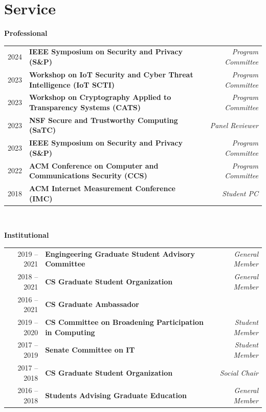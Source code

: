 \documentclass[10pt,singlecolumn]{article} %
\begin{document}

\section{Service}

\textbf{Professional}\\

\begin{tabular}{rlr}
2024 & \textbf{IEEE Symposium on Security and Privacy (S\&P)} & \emph{Program Committee} \\ 
2023 & \textbf{Workshop on IoT Security and Cyber Threat Intelligence (IoT SCTI)} & \emph{Program Committee} \\
2023 & \textbf{Workshop on Cryptography Applied to Transparency Systems (CATS)} & \emph{Program Committee} \\ 
2023 & \textbf{NSF Secure and Trustworthy Computing (SaTC)} & \emph{Panel Reviewer} \\
2023 & \textbf{IEEE Symposium on Security and Privacy (S\&P)} & \emph{Program Committee} \\ 
2022 & \textbf{ACM Conference on Computer and Communications Security (CCS)} & \emph{Program Committee} \\
2018 & \textbf{ACM Internet Measurement Conference (IMC)} & \emph{Student PC} \\
\end{tabular} \\



\vspace{0.3cm}

\textbf{Institutional}\\

\begin{tabular}{rlr}
2019 -- \textsc{2021} & \textbf{Engingeering Graduate Student Advisory Committee} & \emph{General Member} \\
2018 -- \textsc{2021} & \textbf{CS Graduate Student Organization} & \emph{General Member} \\
2016 -- \textsc{2021} & \textbf{CS Graduate Ambassador}\\
2019 -- 2020 & \textbf{CS Committee on Broadening Participation in Computing}  & \emph{Student Member} \\
2017 -- 2019 & \textbf{Senate Committee on IT}  & \emph{Student Member} \\
2017 -- 2018 & \textbf{CS Graduate Student Organization} & \emph{Social Chair} \\
2016 -- 2018 & \textbf{Students Advising Graduate Education} & \emph{General Member} \\
\end{tabular} \\
\end{document}
